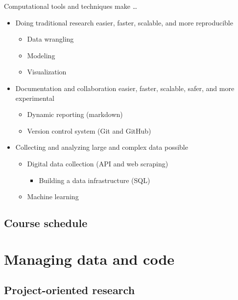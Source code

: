 \documentclass[
]{book}
\providecommand{\tightlist}{%
  \setlength{\itemsep}{0pt}\setlength{\parskip}{0pt}}
\begin{document}
Computational tools and techniques make \ldots{}

\begin{itemize}
\tightlist
\item
  Doing traditional research easier, faster, scalable, and more reproducible

  \begin{itemize}
  \tightlist
  \item
    Data wrangling
  \item
    Modeling
  \item
    Visualization
  \end{itemize}
\item
  Documentation and collaboration easier, faster, scalable, safer, and more experimental

  \begin{itemize}
  \tightlist
  \item
    Dynamic reporting (markdown)
  \item
    Version control system (Git and GitHub)
  \end{itemize}
\item
  Collecting and analyzing large and complex data possible

  \begin{itemize}
  \tightlist
  \item
    Digital data collection (API and web scraping)

    \begin{itemize}
    \tightlist
    \item
      Building a data infrastructure (SQL)
    \end{itemize}
  \item
    Machine learning
  \end{itemize}
\end{itemize}

\hypertarget{course-schedule}{%
\section{Course schedule}\label{course-schedule}}

\hypertarget{Intro}{%
\chapter{Managing data and code}\label{Intro}}

\hypertarget{project-oriented-research}{%
\section{Project-oriented research}\label{project-oriented-research}}
\end{document}
